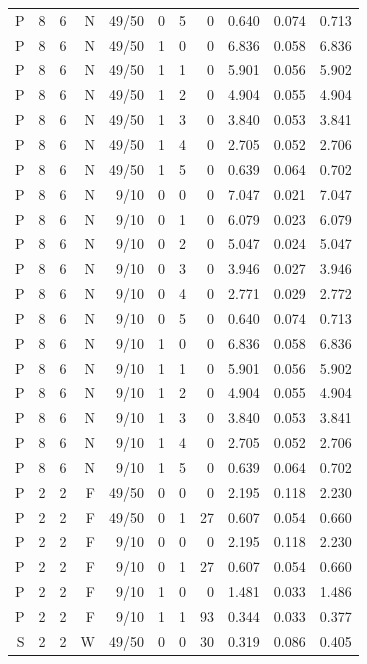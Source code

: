 \begin{longtable}{rrrrrrrrrrr}
P & 8 & 6 & N & 49/50 & 0 & 5 & 0 & 0.640 & 0.074 & 0.713 \\
P & 8 & 6 & N & 49/50 & 1 & 0 & 0 & 6.836 & 0.058 & 6.836 \\
P & 8 & 6 & N & 49/50 & 1 & 1 & 0 & 5.901 & 0.056 & 5.902 \\
P & 8 & 6 & N & 49/50 & 1 & 2 & 0 & 4.904 & 0.055 & 4.904 \\
P & 8 & 6 & N & 49/50 & 1 & 3 & 0 & 3.840 & 0.053 & 3.841 \\
P & 8 & 6 & N & 49/50 & 1 & 4 & 0 & 2.705 & 0.052 & 2.706 \\
P & 8 & 6 & N & 49/50 & 1 & 5 & 0 & 0.639 & 0.064 & 0.702 \\
P & 8 & 6 & N & 9/10 & 0 & 0 & 0 & 7.047 & 0.021 & 7.047 \\
P & 8 & 6 & N & 9/10 & 0 & 1 & 0 & 6.079 & 0.023 & 6.079 \\
P & 8 & 6 & N & 9/10 & 0 & 2 & 0 & 5.047 & 0.024 & 5.047 \\
P & 8 & 6 & N & 9/10 & 0 & 3 & 0 & 3.946 & 0.027 & 3.946 \\
P & 8 & 6 & N & 9/10 & 0 & 4 & 0 & 2.771 & 0.029 & 2.772 \\
P & 8 & 6 & N & 9/10 & 0 & 5 & 0 & 0.640 & 0.074 & 0.713 \\
P & 8 & 6 & N & 9/10 & 1 & 0 & 0 & 6.836 & 0.058 & 6.836 \\
P & 8 & 6 & N & 9/10 & 1 & 1 & 0 & 5.901 & 0.056 & 5.902 \\
P & 8 & 6 & N & 9/10 & 1 & 2 & 0 & 4.904 & 0.055 & 4.904 \\
P & 8 & 6 & N & 9/10 & 1 & 3 & 0 & 3.840 & 0.053 & 3.841 \\
P & 8 & 6 & N & 9/10 & 1 & 4 & 0 & 2.705 & 0.052 & 2.706 \\
P & 8 & 6 & N & 9/10 & 1 & 5 & 0 & 0.639 & 0.064 & 0.702 \\
P & 2 & 2 & F & 49/50 & 0 & 0 & 0 & 2.195 & 0.118 & 2.230 \\
P & 2 & 2 & F & 49/50 & 0 & 1 & 27 & 0.607 & 0.054 & 0.660 \\
P & 2 & 2 & F & 9/10 & 0 & 0 & 0 & 2.195 & 0.118 & 2.230 \\
P & 2 & 2 & F & 9/10 & 0 & 1 & 27 & 0.607 & 0.054 & 0.660 \\
P & 2 & 2 & F & 9/10 & 1 & 0 & 0 & 1.481 & 0.033 & 1.486 \\
P & 2 & 2 & F & 9/10 & 1 & 1 & 93 & 0.344 & 0.033 & 0.377 \\
S & 2 & 2 & W & 49/50 & 0 & 0 & 30 & 0.319 & 0.086 & 0.405 \\

\end{longtable}
